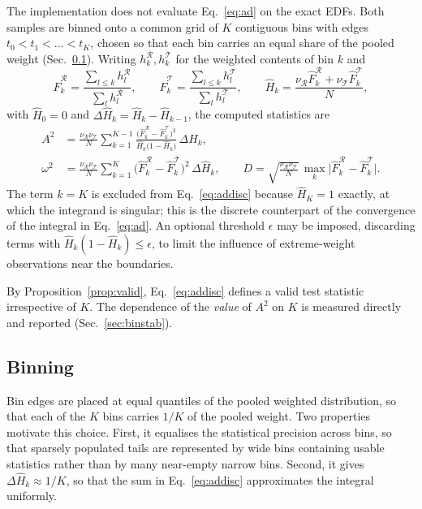\documentclass[11pt,a4paper]{article}
\theoremstyle{definition}
\theoremstyle{plain}
\theoremstyle{remark}
\newcommand{\Rr}{\mathcal{R}}
\newcommand{\Tt}{\mathcal{T}}
\begin{document}
The implementation does not evaluate Eq.~\eqref{eq:ad} on the exact EDFs. Both
samples are binned onto a common grid of $K$ contiguous bins with edges
$t_0 < t_1 < \dots < t_K$, chosen so that each bin carries an equal share of the
pooled weight (Sec.~\ref{sec:binning}). Writing $h^\Rr_k, h^\Tt_k$ for the
weighted contents of bin $k$ and
\begin{equation}
  \hat{F}^{\Rr}_k = \frac{\sum_{l \le k} h^\Rr_l}{\sum_{l} h^\Rr_l},
  \qquad
  \hat{F}^{\Tt}_k = \frac{\sum_{l \le k} h^\Tt_l}{\sum_{l} h^\Tt_l},
  \qquad
  \hat{H}_k = \frac{\nu_\Rr \hat{F}^{\Rr}_k + \nu_\Tt \hat{F}^{\Tt}_k}{N},
\end{equation}
with $\hat{H}_0 = 0$ and $\Delta\hat{H}_k = \hat{H}_k - \hat{H}_{k-1}$, the
computed statistics are
\begin{align}
  A^{2} &= \frac{\nu_\Rr\nu_\Tt}{N} \sum_{k=1}^{K-1}
           \frac{\bigl(\hat{F}^{\Rr}_k-\hat{F}^{\Tt}_k\bigr)^{2}}
                {\hat{H}_k\bigl(1-\hat{H}_k\bigr)}\,\Delta \hat{H}_k ,
           \label{eq:addisc}\\
  \omega^{2} &= \frac{\nu_\Rr\nu_\Tt}{N} \sum_{k=1}^{K}
           \bigl(\hat{F}^{\Rr}_k-\hat{F}^{\Tt}_k\bigr)^{2}\,\Delta \hat{H}_k ,
           \qquad
  D = \sqrt{\frac{\nu_\Rr\nu_\Tt}{N}}\,
      \max_{k}\bigl|\hat{F}^{\Rr}_k-\hat{F}^{\Tt}_k\bigr| .
\end{align}
The term $k=K$ is excluded from Eq.~\eqref{eq:addisc} because $\hat{H}_K = 1$
exactly, at which the integrand is singular; this is the discrete counterpart of
the convergence of the integral in Eq.~\eqref{eq:ad}. An optional threshold
$\epsilon$ may be imposed, discarding terms with
$\hat{H}_k(1-\hat{H}_k) \le \epsilon$, to limit the influence of extreme-weight
observations near the boundaries.

By Proposition~\ref{prop:valid}, Eq.~\eqref{eq:addisc} defines a valid test
statistic irrespective of $K$. The dependence of the \emph{value} of $A^2$ on
$K$ is measured directly and reported (Sec.~\ref{sec:binstab}).

\subsection{Binning}
\label{sec:binning}

Bin edges are placed at equal quantiles of the pooled weighted distribution, so
that each of the $K$ bins carries $1/K$ of the pooled weight. Two properties
motivate this choice. First, it equalises the statistical precision across bins,
so that sparsely populated tails are represented by wide bins containing usable
statistics rather than by many near-empty narrow bins. Second, it gives
$\Delta\hat{H}_k \approx 1/K$, so that the sum in Eq.~\eqref{eq:addisc}
approximates the integral uniformly.
\end{document}
